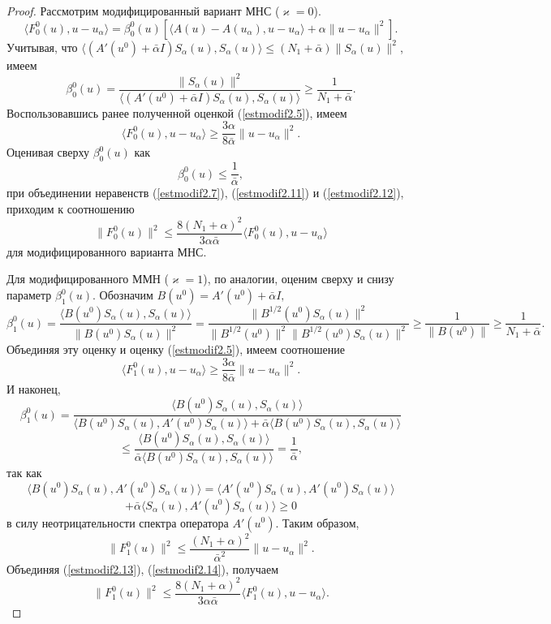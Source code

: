 \begin{proof}
Рассмотрим модифицированный вариант МНС ($\varkappa=0$).
$$\langle F_0^0(u), u-u_\alpha\rangle=\beta_0^0(u)[\langle A(u)-A(u_\alpha), u-u_\alpha\rangle+\alpha\|u-u_\alpha\|^2].$$
Учитывая, что $\langle (A'(u^0)+\bar{\alpha}I)S_\alpha(u), S_\alpha(u)\rangle\le(N_1+\bar{\alpha})\|S_\alpha(u)\|^2$, имеем
$$\beta_0^0(u)=\frac{\|S_\alpha(u)\|^2}{\langle (A'(u^0)+\bar{\alpha}I)S_\alpha(u), S_\alpha(u)\rangle}\ge\frac{1}{N_1+\bar{\alpha}}.$$
Воспользовавшись ранее полученной оценкой (\ref{estmodif2.5}), имеем
\begin{equation}\label{estmodif2.11}
\langle F_0^0(u), u-u_\alpha\rangle\ge\frac{3\alpha}{8\bar{\alpha}}\|u-u_\alpha\|^2.
\end{equation}
Оценивая сверху $\beta_0^0(u)$ как
\begin{equation}\label{estmodif2.12}
\beta_0^0(u)\le\frac{1}{\bar{\alpha}},
\end{equation}
при объединении неравенств (\ref{estmodif2.7}), (\ref{estmodif2.11}) и (\ref{estmodif2.12}), приходим к соотношению
$$\|F_0^0(u)\|^2\le\frac{8(N_1+\alpha)^2}{3\alpha\bar{\alpha}}\langle F_0^0(u), u-u_\alpha\rangle$$ для модифицированного варианта МНС.

Для модифицированного ММН ($\varkappa=1$), по аналогии, оценим сверху и снизу параметр $\beta_1^0(u)$. Обозначим $B(u^0)=A'(u^0)+\bar{\alpha}I,$
$$\beta_1^0(u)=\frac{\langle B(u^0)S_\alpha(u), S_\alpha(u)\rangle}{\|B(u^0)S_\alpha(u)\|^2}=\frac{\|B^{1/2}(u^0)S_\alpha(u)\|^2}{\|B^{1/2}(u^0)\|^2\|B^{1/2}(u^0)S_\alpha(u)\|^2}\ge\frac{1}{\|B(u^0)\|}\ge\frac{1}{N_1+\bar{\alpha}}.$$
Объединяя эту оценку и оценку (\ref{estmodif2.5}), имеем соотношение
\begin{equation}\label{estmodif2.13}
\langle F_1^0(u), u-u_\alpha\rangle\ge\frac{3\alpha}{8\bar{\alpha}}\|u-u_\alpha\|^2.
\end{equation}
И наконец,
$$\beta_1^0(u)=\frac{\langle B(u^0)S_\alpha(u), S_\alpha(u)\rangle}{\langle B(u^0)S_\alpha(u), A'(u^0)S_\alpha(u)\rangle+\bar{\alpha}\langle B(u^0)S_\alpha(u), S_\alpha(u)\rangle}$$
$$\le\frac{\langle B(u^0)S_\alpha(u), S_\alpha(u)\rangle}{\bar{\alpha}\langle B(u^0)S_\alpha(u), S_\alpha(u)\rangle}=\frac{1}{\bar{\alpha}},$$
так как $$\langle B(u^0)S_\alpha(u), A'(u^0)S_\alpha(u)\rangle=\langle A'(u^0)S_\alpha(u), A'(u^0)S_\alpha(u)\rangle$$$$+\bar{\alpha}\langle S_\alpha(u), A'(u^0)S_\alpha(u)\rangle\ge 0$$ в силу неотрицательности спектра оператора $A'(u^0)$. Таким образом,
\begin{equation}\label{estmodif2.14}
\|F_1^0(u)\|^2\le\frac{(N_1+\alpha)^2}{\bar{\alpha}^2}\|u-u_\alpha\|^2.
\end{equation}
Объединяя (\ref{estmodif2.13}), (\ref{estmodif2.14}), получаем
$$\|F_1^0(u)\|^2\le\frac{8(N_1+\alpha)^2}{3\alpha\bar{\alpha}}\langle F_1^0(u), u-u_\alpha\rangle.$$
\end{proof}

